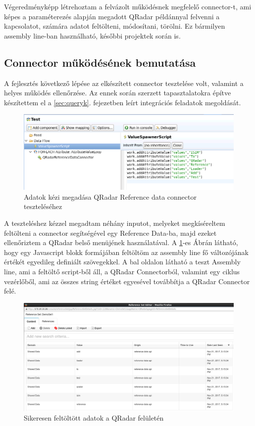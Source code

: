 Végeredményképp létrehoztam a felvázolt működésnek megfelelő connector-t, ami képes a paraméterezés alapján megadott QRadar példánnyal felvenni a kapcsolatot, számára adatot feltölteni, módosítani, törölni. Ez bármilyen assembly line-ban használható, későbbi projektek során is.

\subsection{Connector működésének bemutatása} \label{subsec:conntest}
A fejlesztés következő lépése az elkészített connector tesztelése volt, valamint a helyes működés ellenőrzése. Az ennek során szerzett tapasztalatokra építve készítettem el a \ref{sec:queryk}.  fejezetben leírt integrációs feladatok megoldását.
 \begin{figure}[t]
	\centering
	
	\includegraphics[width=1.0\linewidth]{figures/conn_test/connTest1}
	\caption{Adatok kézi megadása QRadar Reference data connector teszteléséhez}
	\label{fig:conntest1}
\end{figure}
A teszteléshez kézzel megadtam néhány inputot, melyeket megkíséreltem feltölteni a connector segítségével egy Reference Data-ba, majd ezeket ellenőriztem a QRadar belső menüjének használatával.
A  \ref{fig:conntest1}-es Ábrán látható, hogy egy Javascript blokk formájában feltöltöm az assembly line fő változójának értékét egyedileg definiált szövegekkel. A bal oldalon látható a teszt Assembly line, ami a feltöltő script-ből áll, a QRadar Connectorból, valamint egy ciklus vezérlőből, ami az összes string értéket egyesével továbbítja a QRadar Connector felé. 
 
 \begin{figure}
 	\centering
 	\includegraphics[width=1.0\linewidth]{figures/conn_test/qradarTest1}
 	\caption{Sikeresen feltöltött adatok a QRadar felületén}
 	\label{fig:qradartest1}
 \end{figure}
 

